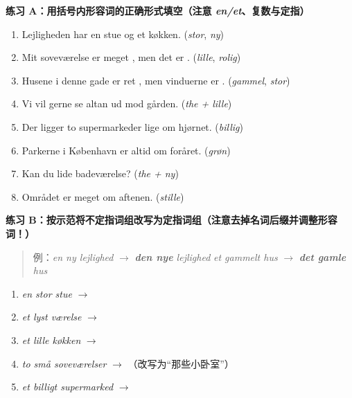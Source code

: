 \textbf{练习 A：用括号内形容词的正确形式填空（注意 \textit{en/et}、复数与定指）}
\begin{enumerate}
  \item Lejligheden har en \underline{\hspace{2.2cm}} stue og et \underline{\hspace{2.2cm}} køkken. (\textit{stor}, \textit{ny})
  \item Mit soveværelse er meget \underline{\hspace{2.2cm}}, men det er \underline{\hspace{2.2cm}}. (\textit{lille}, \textit{rolig})
  \item Husene i denne gade er ret \underline{\hspace{2.2cm}}, men vinduerne er \underline{\hspace{2.2cm}}. (\textit{gammel}, \textit{stor})
  \item Vi vil gerne se \underline{\hspace{2.4cm}} altan ud mod gården. (\textit{the + lille})
  \item Der ligger to \underline{\hspace{2.4cm}} supermarkeder lige om hjørnet. (\textit{billig})
  \item Parkerne i København er altid \underline{\hspace{2.2cm}} om foråret. (\textit{grøn})
  \item Kan du lide \underline{\hspace{2.8cm}} badeværelse? (\textit{the + ny})
  \item Området er meget \underline{\hspace{2.2cm}} om aftenen. (\textit{stille})
\end{enumerate}

\textbf{练习 B：按示范将不定指词组改写为定指词组（注意去掉名词后缀并调整形容词！）}
\begin{quote}
\small 例：\textit{en ny lejlighed} $\rightarrow$ \textit{\textbf{den nye} lejlighed} \qquad \textit{et gammelt hus} $\rightarrow$ \textit{\textbf{det gamle} hus}
\end{quote}
\begin{enumerate}
  \item \textit{en stor stue} $\rightarrow$ \underline{\hspace{4.5cm}}
  \item \textit{et lyst værelse} $\rightarrow$ \underline{\hspace{4.5cm}}
  \item \textit{et lille køkken} $\rightarrow$ \underline{\hspace{4.5cm}}
  \item \textit{to små soveværelser} $\rightarrow$ \underline{\hspace{4.5cm}}（改写为“那些小卧室”）
  \item \textit{et billigt supermarked} $\rightarrow$ \underline{\hspace{4.5cm}}
\end{enumerate}

